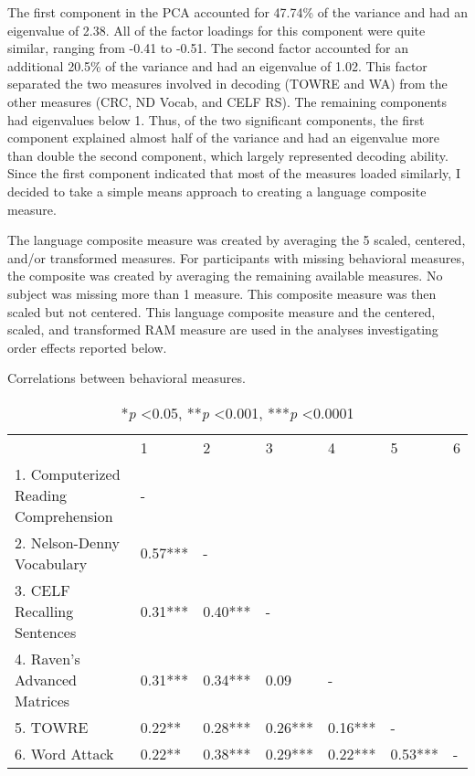 \documentclass[../dissertation.tex]{subfiles}
\begin{document}
	The first component in the PCA accounted for 47.74\% of the variance and had an eigenvalue of 2.38. All of the factor loadings for this component were quite similar, ranging from -0.41 to -0.51. The second factor accounted for an additional 20.5\% of the variance and had an eigenvalue of 1.02. This factor separated the two measures involved in decoding (TOWRE and WA) from the other measures (CRC, ND Vocab, and CELF RS). The remaining components had eigenvalues below 1. Thus, of the two significant components, the first component explained almost half of the variance and had an eigenvalue more than double the second component, which largely represented decoding ability. Since the first component indicated that most of the measures loaded similarly, I decided to take a simple means approach to creating a language composite measure. \par
	The language composite measure was created by averaging the 5 scaled, centered, and/or transformed measures. For participants with missing behavioral measures, the composite was created by averaging the remaining available measures. No subject was missing more than 1 measure. This composite measure was then scaled but not centered. This language composite measure and the centered, scaled, and transformed RAM measure are used in the analyses investigating order effects reported below.
	
\begin{table}[H]
\caption{Correlations between behavioral measures.}
\vspace{-10pt}
\begin{center}
\begin{tabular}{l|l|l|l|l|l|l}
                                      & 1       & 2       & 3       & 4      & 5       & 6 \\
1. Computerized Reading Comprehension & -       &         &         &        &         &   \\
2. Nelson-Denny Vocabulary            & 0.57*** & -       &         &        &         &   \\
3. CELF Recalling Sentences           & 0.31*** & 0.40*** & -       &        &         &   \\
4. Raven's Advanced Matrices          & 0.31*** & 0.34*** & 0.09    & -      &         &   \\
5. TOWRE                              & 0.22**  & 0.28*** & 0.26*** & 0.16*** & -       &   \\
6. Word Attack                        & 0.22**  & 0.38*** & 0.29*** & 0.22*** & 0.53*** & -
\end{tabular}
\label{exp1behcorr}
\end{center}
\vspace{-10pt}
\caption*{*\textit{p} \textless 0.05, **\textit{p} \textless 0.001, ***\textit{p} \textless 0.0001}
\end{table}
\end{document}
